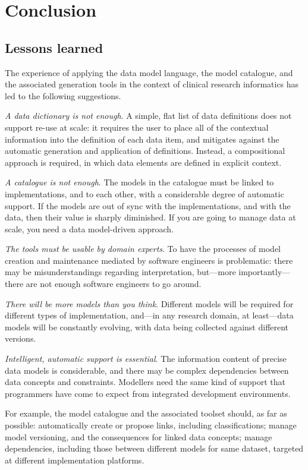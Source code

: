
\section{Conclusion}

\subsection{Lessons learned}

The experience of applying the data model language, the model
catalogue, and the associated generation tools in the context of
clinical research informatics has led to the following suggestions.

\textsl{A data dictionary is not enough}. A simple, flat list of data
definitions does not support re-use at scale: it requires the user to
place all of the contextual information into the definition of each
data item, and mitigates against the automatic generation and
application of definitions.  Instead, a compositional approach is
required, in which data elements are defined in explicit context.

\textsl{A catalogue is not enough}.  The models in the catalogue must
be linked to implementations, and to each other, with a considerable
degree of automatic support.  If the models are out of sync with the
implementations, and with the data, then their value is sharply
diminished.  If you are going to manage data at scale, you need a data
model-driven approach. 

\textsl{The tools must be usable by domain experts}. To have the
processes of model creation and maintenance mediated by software
engineers is problematic: there may be misunderstandings regarding
interpretation, but---more importantly---there are not enough software
engineers to go around.  

\textsl{There will be more models than you think}.  Different models
will be required for different types of implementation, and---in any
research domain, at least---data models will be constantly evolving,
with data being collected against different versions.  

\textsl{Intelligent, automatic support is essential}. The information
content of precise data models is considerable, and there may be
complex dependencies between data concepts and constraints.  Modellers
need the same kind of support that programmers have come to expect
from integrated development environments.  

For example, the model catalogue and the associated toolset should, as
far as possible: automatically create or propose links, including
classifications; manage model versioning, and the consequences for
linked data concepts; manage dependencies, including those between
different models for same dataset, targeted at different
implementation platforms. 

